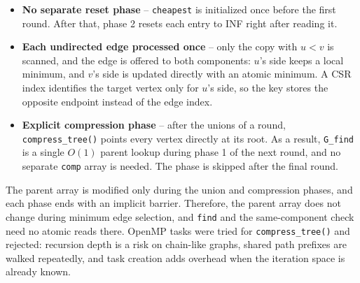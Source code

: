 \documentclass[11pt,a4paper]{article}
\begin{document}
\begin{itemize}
  \item \textbf{No separate reset phase} -- \texttt{cheapest} is initialized once before the first round. After that, phase 2 resets each entry to INF right after reading it.
  \item \textbf{Each undirected edge processed once} -- only the copy with $u < v$ is scanned, and the edge is offered to both components: $u$'s side keeps a local minimum, and $v$'s side is updated directly with an atomic minimum. A CSR index identifies the target vertex only for $u$'s side, so the key stores the opposite endpoint instead of the edge index.
  \item \textbf{Explicit compression phase} -- after the unions of a round, \texttt{compress\_tree()} points every vertex directly at its root. As a result, \texttt{G\_find} is a single $O(1)$ parent lookup during phase 1 of the next round, and no separate \texttt{comp} array is needed. The phase is skipped after the final round.
\end{itemize}

The parent array is modified only during the union and compression phases, and each phase ends with an implicit barrier. Therefore, the parent array does not change during minimum edge selection, and \texttt{find} and the same-component check need no atomic reads there. OpenMP tasks were tried for \texttt{compress\_tree()} and rejected: recursion depth is a risk on chain-like graphs, shared path prefixes are walked repeatedly, and task creation adds overhead when the iteration space is already known.
\end{document}

